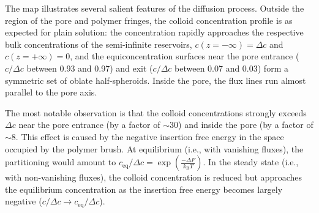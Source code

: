 \documentclass[12pt, a4paper]{article}
\newcommand\todo[1]{\textcolor{red}{#1}}
\begin{document}


The map illustrates several salient features of the diffusion process.
Outside the region of the pore and polymer fringes, the colloid concentration profile is as expected for plain solution: the concentration rapidly approaches the respective bulk concentrations of the semi-infinite reservoirs, $c(z = -\infty) = \Delta c$ and $c(z = +\infty) = 0$, and the equiconcentration surfaces near the pore entrance ($c/\Delta c$ between 0.93 and 0.97) and exit ($c/\Delta c$ between 0.07 and 0.03) form a symmetric set of oblate half-spheroids.
Inside the pore, the flux lines run almost parallel to the pore axis.




The most notable observation is that the colloid concentrations strongly exceeds $\Delta c$ near the pore entrance (by a factor of $\sim30$) and inside the pore (by a factor  of $\sim8$.
This effect is caused by the negative insertion free energy in the space occupied by the polymer brush.
At equilibrium (i.e., with vanishing fluxes), the partitioning would amount to $c_{\text{eq}}/\Delta c = \exp\left( \frac{-\Delta F}{k_{\text{B}} T} \right)$.
In the steady state (i.e., with non-vanishing fluxes), the colloid concentration is reduced but approaches the equilibrium concentration as the insertion free energy becomes largely negative ($c/\Delta c \to c_{\text{eq}}/\Delta c$).
\end{document}
